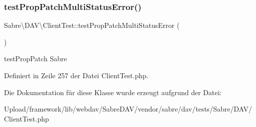 \subsubsection{\texorpdfstring{test\+Prop\+Patch\+Multi\+Status\+Error()}{testPropPatchMultiStatusError()}}
{\footnotesize\ttfamily Sabre\textbackslash{}\+D\+A\+V\textbackslash{}\+Client\+Test\+::test\+Prop\+Patch\+Multi\+Status\+Error (\begin{DoxyParamCaption}{ }\end{DoxyParamCaption})}

test\+Prop\+Patch  Sabre 

Definiert in Zeile 257 der Datei Client\+Test.\+php.



Die Dokumentation für diese Klasse wurde erzeugt aufgrund der Datei\+:\begin{DoxyCompactItemize}
\item 
Upload/framework/lib/webdav/\+Sabre\+D\+A\+V/vendor/sabre/dav/tests/\+Sabre/\+D\+A\+V/Client\+Test.\+php\end{DoxyCompactItemize}
